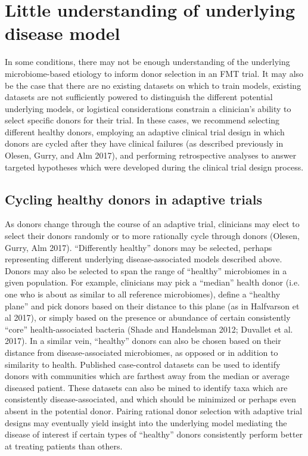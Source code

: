 \section{Little understanding of underlying disease model}

In some conditions, there may not be enough understanding of the underlying microbiome-based etiology to inform donor selection in an FMT trial. It may also be the case that there are no existing datasets on which to train models, existing datasets are not sufficiently powered to distinguish the different potential underlying models, or logistical considerations constrain a clinician's ability to select specific donors for their trial. In these cases, we recommend selecting different healthy donors, employing an adaptive clinical trial design in which donors are cycled after they have clinical failures (as described previously in Olesen, Gurry, and Alm 2017), and performing retrospective analyses to answer targeted hypotheses which were developed during the clinical trial design process.

\subsection{Cycling healthy donors in adaptive trials}

As donors change through the course of an adaptive trial, clinicians may elect to select their donors randomly or to more rationally cycle through donors (Olesen, Gurry, Alm 2017). ``Differently healthy'' donors may be selected, perhaps representing different underlying disease-associated models described above. Donors may also be selected to span the range of ``healthy'' microbiomes in a given population. For example, clinicians may pick a ``median'' health donor (i.e. one who is about as similar to all reference microbiomes), define a ``healthy plane'' and pick donors based on their distance to this plane (as in Halfvarson et al 2017), or simply based on the presence or abundance of certain consistently ``core'' health-associated bacteria (Shade and Handelsman 2012; Duvallet et al. 2017). In a similar vein, ``healthy'' donors can also be chosen based on their distance from disease-associated microbiomes, as opposed or in addition to similarity to health. Published case-control datasets can be used to identify donors with communities which are farthest away from the median or average diseased patient. These datasets can also be mined to identify taxa which are consistently disease-associated, and which should be minimized or perhaps even absent in the potential donor. Pairing rational donor selection with adaptive trial designs may eventually yield insight into the underlying model mediating the disease of interest if certain types of ``healthy'' donors consistently perform better at treating patients than others.

